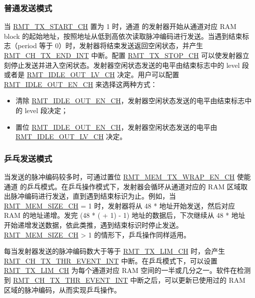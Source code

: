 \documentclass[main\_\_CN.tex]{subfiles}
\begin{document}
\subsubsection{普通发送模式}\label{sec:normal-tx-mode}

当 \hyperref[fielddesc:RMTTXSTARTCHN]{RMT\_TX\_START\_CH} 置为 1 时，通道  的发射器开始从通道对应 RAM block 的起始地址，按照地址从低到高依次读取脉冲编码进行发送。当遇到结束标志（period 等于 0）时，发射器将结束发送返回空闲状态，并产生 \hyperref[int:RMTCHNTXENDINT]{RMT\_CH\_TX\_END\_INT} 中断。配置 \hyperref[fielddesc:RMTTXSTOPCHN]{RMT\_TX\_STOP\_CH} 可以使发射器立刻停止发送并进入空闲状态。发射器空闲状态发送的电平由结束标志中的 level 段或者是 \hyperref[fielddesc:RMTIDLEOUTLVCHN]{RMT\_IDLE\_OUT\_LV\_CH} 决定。用户可以配置 \hyperref[fielddesc:RMTIDLEOUTENCHN]{RMT\_IDLE\_OUT\_EN\_CH} 来选择这两种方式：

\begin{itemize}
    \item 清除 \hyperref[fielddesc:RMTIDLEOUTENCHN]{RMT\_IDLE\_OUT\_EN\_CH}，发射器空闲状态发送的电平由结束标志中的 level 段决定；
    \item 置位 \hyperref[fielddesc:RMTIDLEOUTENCHN]{RMT\_IDLE\_OUT\_EN\_CH}，发射器空闲状态发送的电平由 \hyperref[fielddesc:RMTIDLEOUTLVCHN]{RMT\_IDLE\_OUT\_LV\_CH} 决定。
\end{itemize}


\subsubsection{乒乓发送模式}\label{sec:wrap-tx-mode}

当发送的脉冲编码较多时，可通过置位 \hyperref[fielddesc:RMTMEMTXWRAPENCHN]{RMT\_MEM\_TX\_WRAP\_EN\_CH} 使能通道  的乒乓模式。在乒乓操作模式下，发射器会循环从通道对应的 RAM 区域取出脉冲编码进行发送，直到遇到结束标识为止。例如，当 \hyperref[fielddesc:RMTMEMSIZECHN]{RMT\_MEM\_SIZE\_CH} = 1 时，发射器将从 48 *  地址开始发送，然后对应 RAM 的地址递增。发完 (48 * ( + 1) - 1) 地址的数据后，下次继续从 48 *  地址开始递增发送数据，依此类推，遇到结束标识时停止发送。\hyperref[fielddesc:RMTMEMSIZECHN]{RMT\_MEM\_SIZE\_CH} > 1 的情形下，乒乓操作同样适用。

每当发射器发送的脉冲编码数大于等于 \hyperref[fielddesc:RMTTXLIMCHN]{RMT\_TX\_LIM\_CH} 时，会产生 \hyperref[int:RMTCHNTXTHREVENTINT]{RMT\_CH\_TX\_THR\_EVENT\_INT} 中断。在乒乓模式下，可以设置 \hyperref[fielddesc:RMTTXLIMCHN]{RMT\_TX\_LIM\_CH} 为每个通道对应 RAM 空间的一半或几分之一。软件在检测到 \hyperref[int:RMTCHNTXTHREVENTINT]{RMT\_CH\_TX\_THR\_EVENT\_INT} 中断之后，可以更新已使用过的 RAM 区域的脉冲编码，从而实现乒乓操作。
\end{document}
